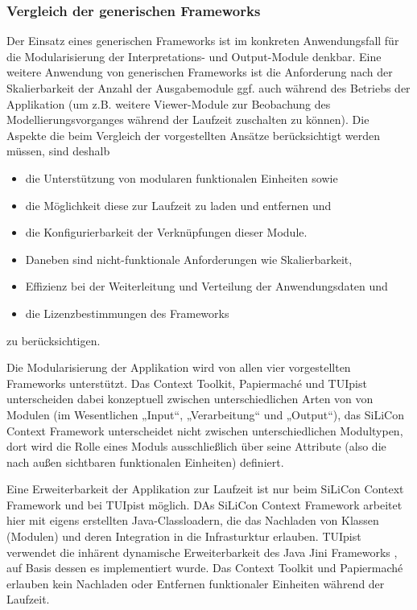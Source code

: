 
\subsubsection{Vergleich der generischen Frameworks}\label{subs:vergleich_generische_frameworks}

Der Einsatz eines generischen Frameworks ist im konkreten Anwendungsfall für die Modularisierung der Interpretations- und Output-Module denkbar. Eine weitere Anwendung von generischen Frameworks ist die Anforderung nach der Skalierbarkeit der Anzahl der Ausgabemodule ggf. auch während des Betriebs der Applikation (um z.B. weitere Viewer-Module zur Beobachung des Modellierungsvorganges während der Laufzeit zuschalten zu können). Die Aspekte die beim Vergleich der vorgestellten Ansätze berücksichtigt werden müssen, sind deshalb
\begin{itemize}
  	\item die Unterstützung von modularen funktionalen Einheiten sowie
	\item die Möglichkeit diese zur Laufzeit zu laden und entfernen und
	\item die Konfigurierbarkeit der Verknüpfungen dieser Module.
	\item Daneben sind nicht-funktionale Anforderungen wie Skalierbarkeit,
	\item Effizienz bei der Weiterleitung und Verteilung der Anwendungsdaten und  
	\item die Lizenzbestimmungen des Frameworks
\end{itemize}  
zu berücksichtigen.

Die Modularisierung der Applikation wird von allen vier vorgestellten Frameworks unterstützt. Das Context Toolkit, Papiermaché und TUIpist unterscheiden dabei konzeptuell zwischen unterschiedlichen Arten von von Modulen (im Wesentlichen „Input“, „Verarbeitung“ und „Output“), das SiLiCon Context Framework unterscheidet nicht zwischen unterschiedlichen Modultypen, dort wird die Rolle eines Moduls ausschließlich über seine Attribute (also die nach außen sichtbaren funktionalen Einheiten) definiert. 

Eine Erweiterbarkeit der Applikation zur Laufzeit ist nur beim SiLiCon Context Framework und bei TUIpist möglich. DAs SiLiCon Context Framework arbeitet hier mit eigens erstellten Java-Classloadern, die das Nachladen von Klassen (Modulen) und deren Integration in die Infrasturktur erlauben. TUIpist verwendet die inhärent dynamische Erweiterbarkeit des Java Jini Frameworks \citep{Arnold99}, auf Basis dessen es implementiert wurde. Das Context Toolkit und Papiermaché erlauben kein Nachladen oder Entfernen funktionaler Einheiten während der Laufzeit.

